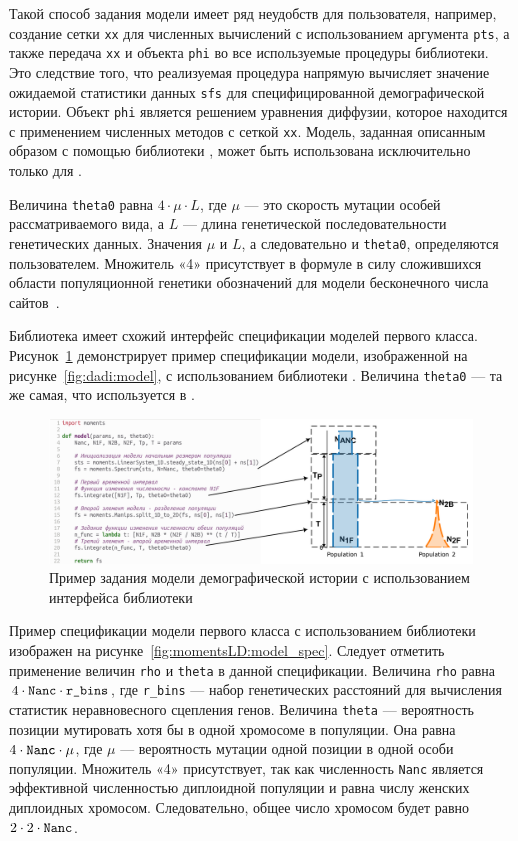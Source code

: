 Такой способ задания модели имеет ряд неудобств для пользователя, например, создание сетки \texttt{xx} для численных вычислений с использованием аргумента \texttt{pts}, а также передача \texttt{xx} и объекта \texttt{phi} во все используемые процедуры библиотеки.
Это следствие того, что реализуемая процедура напрямую вычисляет значение ожидаемой статистики данных \texttt{sfs} для специфицированной демографической истории.
Объект \texttt{phi} является решением уравнения диффузии, которое находится с применением численных методов с сеткой \texttt{xx}.
Модель, заданная описанным образом с помощью библиотеки \dadi, может быть использована исключительно только для \dadi.

Величина \texttt{theta0} равна $4\cdot \mu \cdot L$, где $\mu$ --- это скорость мутации особей рассматриваемого вида, а $L$ --- длина генетической последовательности генетических данных.
Значения $\mu$ и $L$, а следовательно и \texttt{theta0}, определяются пользователем.
Множитель «4» присутствует в формуле в силу сложившихся области популяционной генетики обозначений для модели бесконечного числа сайтов~\cite{gutenkunst2009inferring}.

Библиотека \moments имеет схожий интерфейс спецификации моделей первого класса.
Рисунок~\ref{fig:moments:model_spec} демонстрирует пример спецификации модели, изображенной на рисунке~\ref{fig:dadi:model}, с использованием библиотеки \moments.
Величина \texttt{theta0} --- та же самая, что используется в \dadi.

\begin{figure}[ht]
    \centering
    \includegraphics[width=\linewidth]{images_2/moments_model.pdf}
    \caption{Пример задания модели демографической истории с использованием интерфейса библиотеки~\moments}
    \label{fig:moments:model_spec}
\end{figure}

Пример спецификации модели первого класса с использованием библиотеки \momentsLD изображен на рисунке~\ref{fig:momentsLD:model_spec}.
Следует отметить применение величин \texttt{rho} и \texttt{theta} в данной спецификации.
Величина \texttt{rho} равна $4\cdot \text{\texttt{Nanc}} \cdot \text{\texttt{r\_bins}}$, где \texttt{r\_bins} --- набор генетических расстояний для вычисления статистик неравновесного сцепления генов.
Величина \texttt{theta} --- вероятность позиции мутировать хотя бы в одной хромосоме в популяции.
Она равна $4\cdot \text{\texttt{Nanc}} \cdot \mu$, где $\mu$ --- вероятность мутации одной позиции в одной особи популяции.
Множитель «4» присутствует, так как численность \texttt{Nanc} является эффективной численностью диплоидной популяции и равна числу женских диплоидных хромосом.
Следовательно, общее число хромосом будет равно $2 \cdot 2 \cdot \text{\texttt{Nanc}}$.

